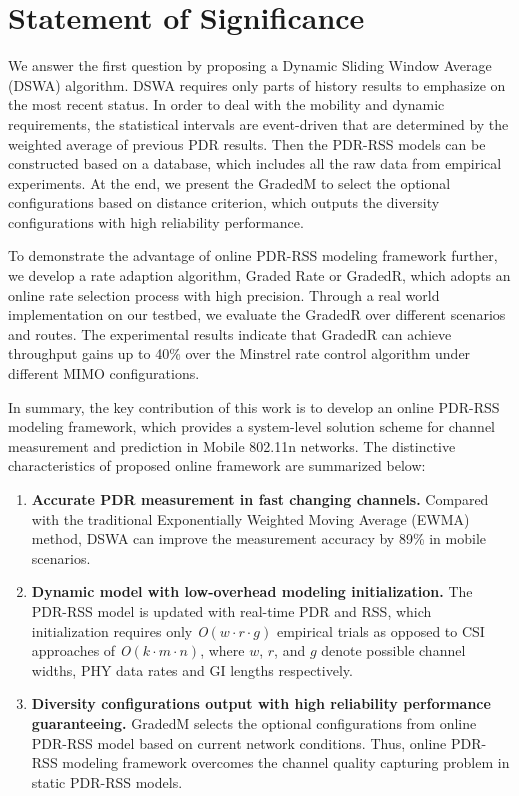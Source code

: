 \documentclass[draftclsnofoot,journal,onecolumn,11pt]{IEEEtran}
\begin{document}
\section{Statement of Significance}
We answer the first question by proposing a Dynamic Sliding Window Average (DSWA) algorithm. DSWA requires only parts of history results to emphasize on the most recent status. In order to deal with the mobility and dynamic requirements, the statistical intervals are event-driven that are determined by the weighted average of previous PDR results. Then the PDR-RSS models can be constructed based on a database, which includes all the raw data from empirical experiments. At the end, we present the GradedM to select the optional configurations based on distance criterion, which outputs the diversity configurations with high reliability performance.

To demonstrate the advantage of online PDR-RSS modeling framework further, we develop a rate adaption algorithm, Graded Rate or GradedR, which adopts an online rate selection process with high precision. Through a real world implementation on our testbed, we evaluate the GradedR over different scenarios and routes. The experimental results indicate that GradedR can achieve throughput gains up to 40\% over the Minstrel rate control algorithm under different MIMO configurations.

In summary, the key contribution of this work is to develop an online PDR-RSS modeling framework, which provides a system-level solution scheme for channel measurement and prediction in Mobile 802.11n networks. The distinctive characteristics of proposed online framework are summarized below:
\begin{enumerate}
\item
\textbf{Accurate PDR measurement in fast changing channels.} Compared with the traditional Exponentially Weighted Moving Average (EWMA) method, DSWA can improve the measurement accuracy by 89\% in mobile scenarios.
\item
\textbf{Dynamic model with low-overhead modeling initialization.}  The PDR-RSS model is updated with real-time PDR and RSS, which initialization requires only \textit{O}$(w\cdot r\cdot g)$ empirical trials as opposed to CSI approaches of \textit{O}$(k\cdot m\cdot n)$, where $w$, $r$, and $g$ denote possible channel widths, PHY data rates and GI lengths respectively.
\item
\textbf{Diversity configurations output with high reliability performance guaranteeing.} GradedM selects the optional configurations from online PDR-RSS model based on current network conditions. Thus, online PDR-RSS modeling framework overcomes the channel quality capturing problem in static PDR-RSS models.
\end{enumerate}
\end{document}

